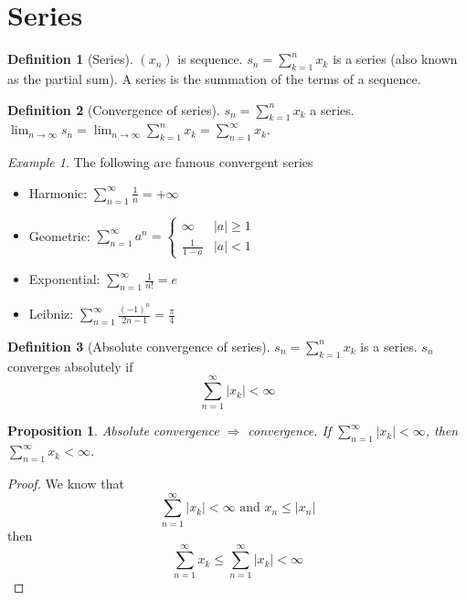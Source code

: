 \documentclass{article}
\newcommand{\DS}{\displaystyle}
\newcommand{\abs}[1]{\left|#1\right|}
\newcommand{\Ar}{\Rightarrow}
\newcommand{\limn}{\lim_{n \to \infty}}
\theoremstyle{definition}
\newtheorem{definition}{Definition}[section]
\theoremstyle{definition}
\theoremstyle{plain}
\theoremstyle{plain}
\theoremstyle{plain}
\theoremstyle{plain}
\newtheorem{proposition}[theorem]{Proposition}
\theoremstyle{definition}
\theoremstyle{remark}
\newtheorem{exampled}{Example}[definition]
\theoremstyle{remark}
\theoremstyle{remark}
\theoremstyle{remark}
\newcommand{\sumn}{\sum_{k=1}^n}
\newcommand{\series}{\sum_{n=1}^\infty}
\begin{document}
\newpage
\section{Series}


\begin{definition}[Series]
  $(x_n)$ is sequence. $\DS s_n = \sumn{x_k}$ is a series (also known as the partial sum). A series is the summation of the terms of a sequence.
\end{definition}


\begin{definition}[Convergence of series]
  $\DS s_n = \sumn{x_k}$ a series. $\DS \limn s_n = \limn \sumn{x_k} = \series{x_k}$.
\end{definition}

\begin{exampled}
  The following are famous convergent series
  \begin{itemize}
    \item Harmonic: $\DS \series{\frac{1}{n}} = +\infty$
    \item Geometric: $\DS \series{a^n} = \begin{cases}
    \infty & \abs{a} \geq 1 \\ \frac{1}{1-a} & \abs{a} < 1\end{cases}$
    \item Exponential: $\DS \series{\frac{1}{n!}} = e$
    \item Leibniz: $\DS \series{\frac{(-1)^n}{2n-1}} = \frac{\pi}{4}$
  \end{itemize}
\end{exampled}


\begin{definition}[Absolute convergence of series]
  $\DS s_n = \sumn{x_k}$ is a series. $s_n$ converges absolutely if
  \[\DS \series{\abs{x_k}} < \infty\]
\end{definition}


\begin{proposition}
  Absolute convergence $\Ar$ convergence. If $\DS \series{\abs{x_k}} < \infty$, then $\DS \series{x_k} < \infty$.
\end{proposition}

\begin{proof}
  We know that
  \[\series{\abs{x_k}} < \infty \text{ and } x_n \leq \abs{x_n}\]
  then
  \[ \series{x_k} \leq \series{\abs{x_k}} < \infty\]
\end{proof}
\end{document}
